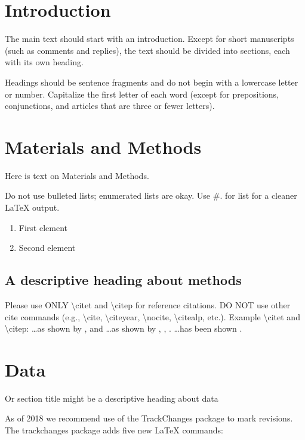 \documentclass[draft,linenumbers]{agujournal2018}
\begin{document}
\section{Introduction}

The main text should start with an introduction. Except for short
manuscripts (such as comments and replies), the text should be divided
into sections, each with its own heading.

Headings should be sentence fragments and do not begin with a lowercase
letter or number. Capitalize the first letter of each word (except for
prepositions, conjunctions, and articles that are three or fewer
letters).

\section{Materials and Methods}

Here is text on Materials and Methods.

Do not use bulleted lists; enumerated lists are okay. Use \#. for list
for a cleaner LaTeX output.

\begin{enumerate}
\item
  First element
\item
  Second element
\end{enumerate}

\subsection{A descriptive heading about methods}

Please use ONLY \textbackslash citet and \textbackslash citep for
reference citations. DO NOT use other cite commands (e.g.,
\textbackslash cite, \textbackslash citeyear, \textbackslash nocite,
\textbackslash citealp, etc.). Example \textbackslash citet and
\textbackslash citep: \ldots as shown by \citet{Levitus2012},
\citet{Nuncio2011} and \citet{Raphael2004} \ldots as shown by
\citep{Levitus2012}, \citep{Nuncio2011}, \citep{Raphael2004}. \ldots has
been shown \citep[e.g.,][]{Levitus2012, Nuncio2011, Raphael2004}.

\section{Data}

Or section title might be a descriptive heading about data

As of 2018 we recommend use of the TrackChanges package to mark
revisions. The trackchanges package adds five new LaTeX commands:
\end{document}
